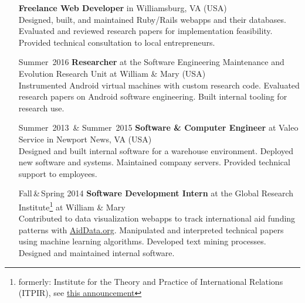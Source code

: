 \documentclass{res}     %
\begin{document}
\begin{resume}
\begin{itemize}[font=\itshape,align=parleft,labelwidth=3cm,leftmargin=2cm]
        \textbf{Freelance Web Developer}
        in Williamsburg, VA (USA)
        \vspace{1mm} \\
        Designed, built, and maintained Ruby/Rails webapps and their databases.
        Evaluated and reviewed research papers for implementation feasibility.
        Provided technical consultation to local entrepreneurs.
    \item[Summer~2016]
        \textbf{Researcher}
        at the Software Engineering Maintenance and Evolution Research Unit
        at William \& Mary (USA)
        \vspace{1mm} \\
        Instrumented Android virtual machines with custom research code.
        Evaluated research papers on Android software engineering.
        Built internal tooling for research use.
    \item[Summer~2013~\& Summer~2015]
        \textbf{Software \& Computer Engineer}
        at Valeo Service
        in Newport News, VA (USA)
        \vspace{1mm} \\
        Designed and built internal software for a warehouse environment.
        Deployed new software and systems.
        Maintained company servers.
        Provided technical support to employees.
    \item[Fall\,\&\,Spring 2014]
        \textbf{Software Development Intern}
        at the Global Research Institute\footnote{formerly: Institute for the Theory and Practice of International Relations (ITPIR), see \href{https://magazine.wm.edu/issue/2019-winter/new-name-for-itpir.php}{this announcement}}
        at William \& Mary
        \vspace{1mm} \\
        Contributed to data visualization webapps to track international aid funding patterns with \href{https://aiddata.org}{AidData.org}.
        Manipulated and interpreted technical papers using machine learning algorithms.
        Developed text mining processes.
        Designed and maintained internal software.
\end{itemize}


\end{resume}
\end{document}
